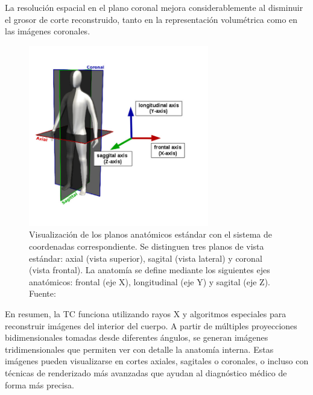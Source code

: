 La resolución espacial en el plano coronal mejora considerablemente al disminuir el grosor de corte reconstruido, tanto en la representación volumétrica como en las imágenes coronales.

\begin{figure}[!htbp]
    \centering
    \includegraphics[width=0.7\textwidth]{img/ejes_ct.jpg}
    \caption{Visualización de los planos anatómicos estándar con el sistema de coordenadas correspondiente. Se distinguen tres planos de vista estándar: axial (vista superior), sagital (vista lateral) y coronal (vista frontal). La anatomía se define mediante los siguientes ejes anatómicos: frontal (eje X), longitudinal (eje Y) y sagital (eje Z). Fuente: \cite{heim2018large}}
    \label{fig:ct_ejes_anatomicos}
\end{figure}


En resumen, la TC funciona utilizando rayos X y algoritmos especiales para reconstruir imágenes del interior del cuerpo. A partir de múltiples proyecciones bidimensionales tomadas desde diferentes ángulos, se generan imágenes tridimensionales que permiten ver con detalle la anatomía interna. Estas imágenes pueden visualizarse en cortes axiales, sagitales o coronales, o incluso con técnicas de renderizado más avanzadas que ayudan al diagnóstico médico de forma más precisa.

